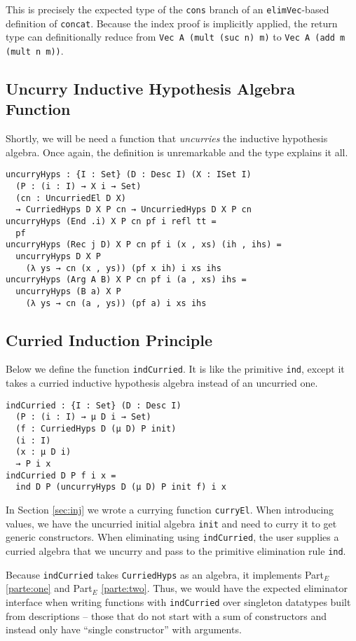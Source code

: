 \documentclass[preprint,nonatbib]{sigplanconf}
\newcommand{\refsec}[1]{Section \ref{sec:#1}}
\newcommand{\refparte}[1]{Part$_E$ \ref{parte:#1}}
\begin{document}
This is precisely the expected type of the {\tt cons} branch of
an {\tt elimVec}-based definition of {\tt concat}. Because the index
proof is implicitly applied, the return type can definitionally
reduce from {\tt Vec A (mult (suc n) m)}
to {\tt Vec A (add m (mult n m))}.

\subsection{Uncurry Inductive Hypothesis Algebra Function}

Shortly, we will be need a function that {\it uncurries} the inductive
hypothesis algebra. Once again, the definition is unremarkable and the
type explains it all.

\begin{verbatim}
uncurryHyps : {I : Set} (D : Desc I) (X : ISet I)
  (P : (i : I) → X i → Set)
  (cn : UncurriedEl D X)
  → CurriedHyps D X P cn → UncurriedHyps D X P cn
uncurryHyps (End .i) X P cn pf i refl tt =
  pf
uncurryHyps (Rec j D) X P cn pf i (x , xs) (ih , ihs) =
  uncurryHyps D X P
    (λ ys → cn (x , ys)) (pf x ih) i xs ihs
uncurryHyps (Arg A B) X P cn pf i (a , xs) ihs =
  uncurryHyps (B a) X P
    (λ ys → cn (a , ys)) (pf a) i xs ihs
\end{verbatim}

\subsection{Curried Induction Principle}

Below we define
the function {\tt indCurried}. It is like the primitive {\tt ind},
except it takes a curried inductive hypothesis algebra instead of an
uncurried one. 

\begin{verbatim}
indCurried : {I : Set} (D : Desc I)
  (P : (i : I) → μ D i → Set)
  (f : CurriedHyps D (μ D) P init)
  (i : I)
  (x : μ D i)
  → P i x
indCurried D P f i x =
  ind D P (uncurryHyps D (μ D) P init f) i x
\end{verbatim}

In \refsec{inj} we wrote a currying function
{\tt curryEl}. When introducing values, we have the uncurried initial
algebra {\tt init} and need to curry it to get generic constructors.
When eliminating using {\tt indCurried},
the user supplies a curried algebra that we uncurry
and pass to the primitive elimination rule {\tt ind}.

Because
{\tt indCurried} takes {\tt CurriedHyps} as an algebra, it implements
\refparte{one} and \refparte{two}.
Thus, we would have the expected eliminator interface when writing
functions with {\tt indCurried} over singleton datatypes built from
descriptions -- those that do not start with a sum of constructors and
instead only have ``single constructor'' with arguments.
\end{document}

